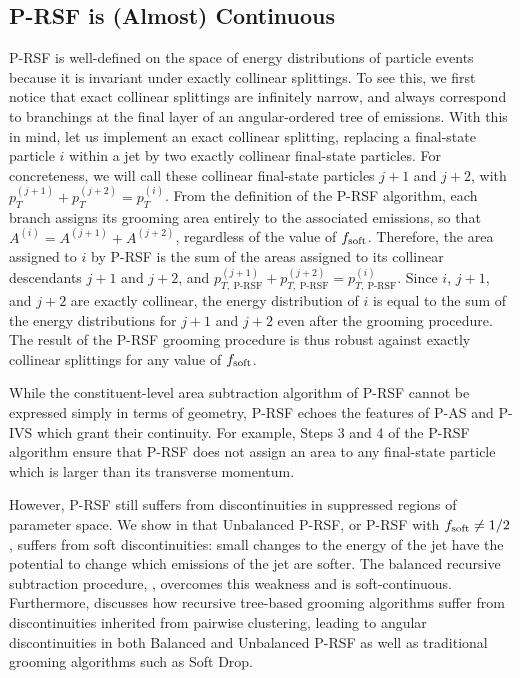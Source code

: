 \subsection{P-RSF is (Almost) Continuous}
P-RSF is well-defined on the space of energy distributions of particle events because it is invariant under exactly collinear splittings.
%
To see this, we first notice that exact collinear splittings are infinitely narrow, and always correspond to branchings at the final layer of an angular-ordered tree of emissions.
%
With this in mind, let us implement an exact collinear splitting, replacing a final-state particle \(i\) within a jet by two exactly collinear final-state particles.
%
For concreteness, we will call these collinear final-state particles \(j+1\) and \(j+2\), with \(p_T^{(j+1)} + p_T^{(j+2)} = p_T^{(i)}\).
%
From the definition of the P-RSF algorithm, each branch assigns its grooming area entirely to the associated emissions, so that \(A^{(i)} = A^{(j+1)} + A^{(j+2)}\), regardless of the value of \(f_{\rm soft}\).
%
Therefore, the area assigned to \(i\) by P-RSF is the sum of the areas assigned to its collinear descendants \(j+1\) and \(j+2\), and \(p^{(j+1)}_{T,~{\text{P-RSF}}} + p^{(j+2)}_{T,~{\text{P-RSF}}} = p^{(i)}_{T,~{\text{P-RSF}}}\).
%
Since \(i\), \(j+1\), and \(j+2\) are exactly collinear, the energy distribution of \(i\) is equal to the sum of the energy distributions for \(j+1\) and \(j+2\) even after the grooming procedure.
%
The result of the P-RSF grooming procedure is thus robust against exactly collinear splittings for any value of \(f_{\rm soft}\).

While the constituent-level area subtraction algorithm of P-RSF cannot be expressed simply in terms of geometry, P-RSF echoes the features of P-AS and P-IVS which grant their continuity.
%
For example, Steps 3 and 4
of the P-RSF algorithm ensure that P-RSF does not assign an area to any final-state particle which is larger than its transverse momentum.

However, P-RSF still suffers from discontinuities in suppressed regions of parameter space.
%
We show in  that Unbalanced P-RSF, or P-RSF with \(f_{\rm soft} \neq 1/2\), suffers from soft discontinuities:
%
small changes to the energy of the jet have the potential to change which emissions of the jet are softer.
%
The balanced recursive subtraction procedure, , overcomes this weakness and is soft-continuous.
%
Furthermore,  discusses how recursive tree-based grooming algorithms suffer from discontinuities inherited from pairwise clustering, leading to angular discontinuities in both Balanced and Unbalanced P-RSF as well as traditional grooming algorithms such as Soft Drop.

